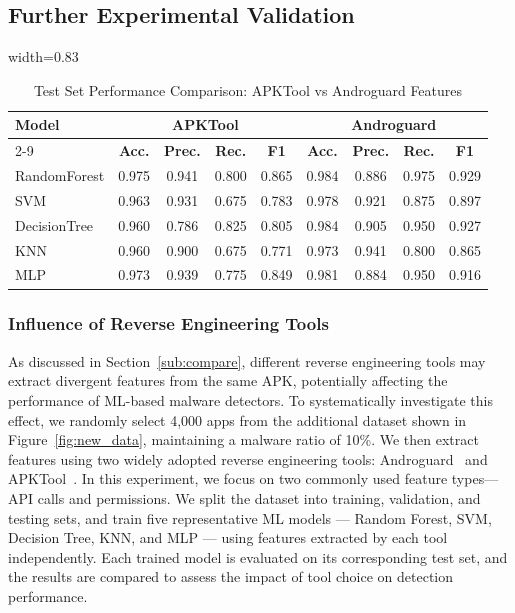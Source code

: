 \subsection{Further Experimental Validation}
\label{further_experiments}
\begin{table}[t]
\centering
\caption{Test Set Performance Comparison: APKTool vs Androguard Features}
\label{tab:results}
\renewcommand{\arraystretch}{1.1}
\begin{adjustbox}{width=0.83\linewidth}
\begin{tabular}{l|cccc|cccc}
\hline
\multirow{2}{*}{\textbf{Model}} & \multicolumn{4}{c|}{\textbf{APKTool}} & \multicolumn{4}{c}{\textbf{Androguard}} \\
\cline{2-9}
& \textbf{Acc.} & \textbf{Prec.} & \textbf{Rec.} & \textbf{F1} & \textbf{Acc.} & \textbf{Prec.} & \textbf{Rec.} & \textbf{F1} \\
\hline
RandomForest & 0.975 & 0.941 & 0.800 & 0.865 & 0.984 & 0.886 & 0.975 & 0.929 \\
SVM          & 0.963 & 0.931 & 0.675 & 0.783 & 0.978 & 0.921 & 0.875 & 0.897 \\
DecisionTree & 0.960 & 0.786 & 0.825 & 0.805 & 0.984 & 0.905 & 0.950 & 0.927 \\
KNN          & 0.960 & 0.900 & 0.675 & 0.771 & 0.973 & 0.941 & 0.800 & 0.865 \\
MLP          & 0.973 & 0.939 & 0.775 & 0.849 & 0.981 & 0.884 & 0.950 & 0.916 \\
\hline
\end{tabular}
\end{adjustbox}
\vspace{-0.5cm}
\end{table}

\subsubsection{\textbf{Influence of Reverse Engineering Tools}}
\label{tool_influence}
As discussed in Section~\ref{sub:compare}, different reverse engineering tools may extract divergent features from the same APK, potentially affecting the performance of ML-based malware detectors.
To systematically investigate this effect, we randomly select 4,000 apps from the additional dataset shown in Figure~\ref{fig:new_data}, maintaining a malware ratio of 10\%.
We then extract features using two widely adopted reverse engineering tools: Androguard~\cite{androguard} and APKTool~\cite{apkt}.
In this experiment, we focus on two commonly used feature types—API calls and permissions.
We split the dataset into training, validation, and testing sets, and train five representative ML models --- Random Forest, SVM, Decision Tree, KNN, and MLP --- using features extracted by each tool independently.
Each trained model is evaluated on its corresponding test set, and the results are compared to assess the impact of tool choice on detection performance.

